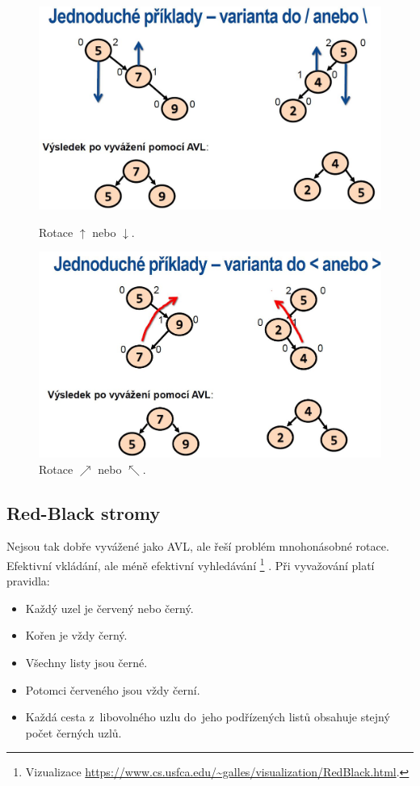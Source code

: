 \begin{figure}[ht]
	\begin{minipage}[b]{0.47\textwidth}
		\includegraphics[width=\textwidth]{images/Rotation1Type.JPG}
		\caption{Rotace $\uparrow$ nebo $\downarrow$.}
	\end{minipage}
	\hspace*{1em}%
	\begin{minipage}[b]{0.47\textwidth}
		\includegraphics[width=\textwidth]{images/Rotation2Type.JPG}
		\caption{Rotace $\nearrow$ nebo $\nwarrow$.}
	\end{minipage}
\end{figure}

\subsection{Red-Black stromy}

Nejsou tak dobře vyvážené jako AVL, ale řeší problém mnohonásobné rotace. Efektivní vkládání, ale méně efektivní vyhledávání%
\footnote{Vizualizace \url{https://www.cs.usfca.edu/~galles/visualization/RedBlack.html}.}%
. Při vyvažování platí pravidla:
\begin{itemize}[noitemsep]
	\item Každý uzel je červený nebo černý.
	\item Kořen je vždy černý.
	\item Všechny listy jsou černé.
	\item Potomci červeného jsou vždy černí.
	\item Každá cesta z~libovolného uzlu do~jeho podřízených listů obsahuje stejný počet černých uzlů.
\end{itemize}

